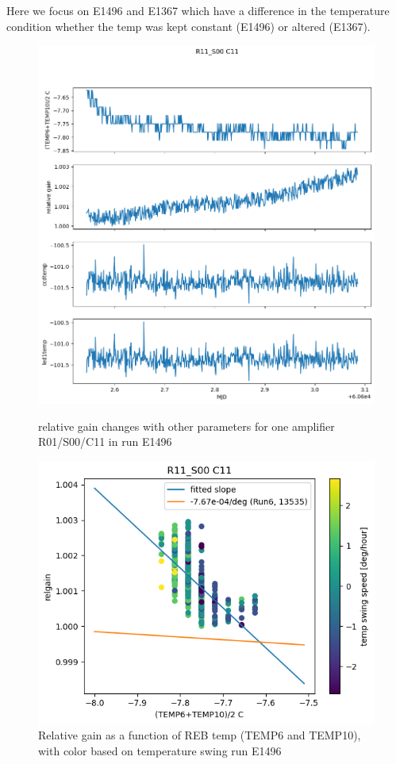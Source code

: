 Here we focus on E1496 and E1367 which have a difference in the temperature condition whether the temp was kept constant (E1496) or altered (E1367).

\begin{figure}[htbp]
\centering
\begin{minipage}{0.45\textwidth}
    \centering
    \includegraphics[width=\textwidth]{figures/gaintemp/E1496RelgainParametersTrending.png}
    \caption{relative gain changes with other parameters for one amplifier R01/S00/C11 in run E1496}
    \label{fig:relgainparamE1496}
\end{minipage}
\hfill
\begin{minipage}{0.45\textwidth}
    \centering
    \includegraphics[width=\textwidth]{figures/gaintemp/E1496RelgainDetail.png}
    \caption{Relative gain as a function of REB temp (TEMP6 and TEMP10), with color based on temperature swing run E1496}
    \label{fig:gaintempE1496}
\end{minipage}
\end{figure}

